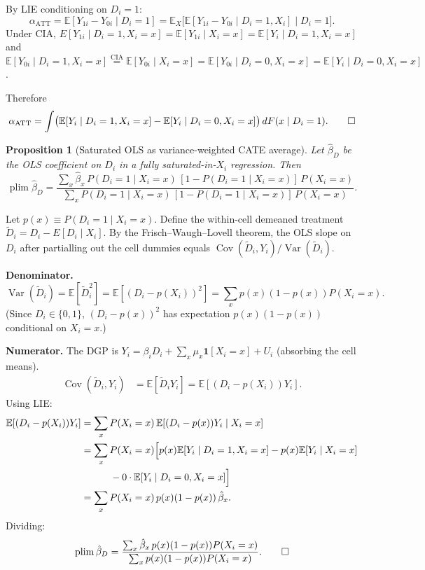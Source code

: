 \documentclass[12pt,a4paper]{article}
\theoremstyle{plain}
\newtheorem{propositio}{Proposition}[section]
\theoremstyle{definition}
\renewenvironment{proof}{\pushQED{\qed}\normalfont}{\popQED\par\nobreak}
\newcommand{\E}{\mathbb{E}}
\newcommand{\Cov}{\operatorname{Cov}}
\newcommand{\Var}{\operatorname{Var}}
\newcommand{\plim}{\operatorname{plim}}
\newcommand{\ATT}{\alpha_{\mathrm{ATT}}}
\begin{document}
\begin{proof}
By LIE conditioning on $D_i=1$:
\[
  \ATT = \E[Y_{1i}-Y_{0i}\mid D_i=1] = \E_X\bigl[\E[Y_{1i}-Y_{0i}\mid D_i=1,X_i]\mid D_i=1\bigr].
\]
Under CIA, $E[Y_{1i}\mid D_i=1,X_i=x]=\E[Y_{1i}\mid X_i=x]=\E[Y_i\mid D_i=1,X_i=x]$ and
$\E[Y_{0i}\mid D_i=1,X_i=x]\overset{\text{CIA}}{=}\E[Y_{0i}\mid X_i=x]=\E[Y_{0i}\mid D_i=0,X_i=x]=\E[Y_i\mid D_i=0,X_i=x]$.

Therefore
\[
  \ATT = \int \bigl(\E[Y_i\mid D_i=1,X_i=x]-\E[Y_i\mid D_i=0,X_i=x]\bigr)\,dF(x\mid D_i=1). \qedhere
\]
\end{proof}

\begin{propositio}[Saturated OLS as variance-weighted CATE average\label{prop:regression_weight}]
Let $\hat\beta_D$ be the OLS coefficient on $D_i$ in a fully saturated-in-$X_i$ regression. Then
\[
  \plim\hat\beta_D
  = \frac{\sum_x \hat\beta_x\, P(D_i=1\mid X_i=x)\,[1-P(D_i=1\mid X_i=x)]\,P(X_i=x)}
         {\sum_x P(D_i=1\mid X_i=x)\,[1-P(D_i=1\mid X_i=x)]\,P(X_i=x)}.
\]
\end{propositio}

\begin{proof}
Let $p(x)\equiv P(D_i=1\mid X_i=x)$.  Define the within-cell demeaned treatment $\tilde D_i = D_i - E[D_i\mid X_i]$.  By the Frisch--Waugh--Lovell theorem, the OLS slope on $D_i$ after partialling out the cell dummies equals $\Cov(\tilde D_i,Y_i)/\Var(\tilde D_i)$.

\textbf{Denominator.}
\[
  \Var(\tilde D_i)
  = \E[\tilde D_i^2]
  = \E\!\left[(D_i-p(X_i))^2\right]
  = \sum_x p(x)(1-p(x))P(X_i=x).
\]
(Since $D_i\in\{0,1\}$, $(D_i-p(x))^2$ has expectation $p(x)(1-p(x))$ conditional on $X_i=x$.)

\textbf{Numerator.}  The DGP is $Y_i = \beta_i D_i + \sum_x \mu_x \mathbf{1}[X_i=x] + U_i$ (absorbing the cell means).
\begin{align*}
  \Cov(\tilde D_i,Y_i)
  &= \E[\tilde D_i Y_i]
   = \E\!\left[(D_i-p(X_i))Y_i\right].
\end{align*}
Using LIE:
\begin{align*}
  \E\!\left[(D_i-p(X_i))Y_i\right]
  &= \sum_x P(X_i=x)\,\E[(D_i-p(x))Y_i\mid X_i=x]\\
  &= \sum_x P(X_i=x)\Bigl[p(x)\E[Y_i\mid D_i=1,X_i=x] - p(x)\E[Y_i\mid X_i=x]\\
  &\qquad\quad - 0\cdot\E[Y_i\mid D_i=0,X_i=x]\Bigr]\\
  &= \sum_x P(X_i=x)\,p(x)(1-p(x))\,\hat\beta_x.
\end{align*}
Dividing:
\[
  \plim\hat\beta_D
  = \frac{\sum_x \hat\beta_x\,p(x)(1-p(x))P(X_i=x)}
         {\sum_x p(x)(1-p(x))P(X_i=x)}.
\qedhere
\]
\end{proof}
\end{document}
